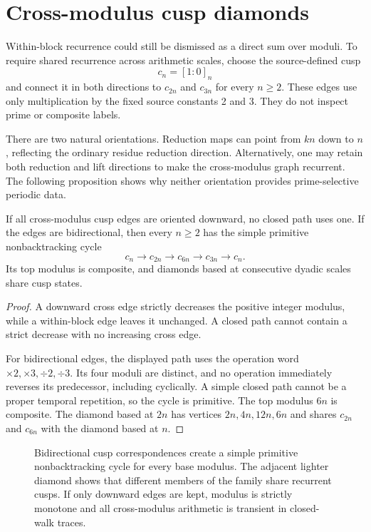 \section{Cross-modulus cusp diamonds}
\label{sec:cusp-diamonds}

Within-block recurrence could still be dismissed as a direct sum over
moduli.  To require shared recurrence across arithmetic scales, choose the
source-defined cusp
\[
 c_n=[1:0]_n
\]
and connect it in both directions to $c_{2n}$ and $c_{3n}$ for every
$n\ge2$.  These edges use only multiplication by the fixed source constants 2
and 3.  They do not inspect prime or composite labels.

There are two natural orientations.  Reduction maps can point from $kn$ down
to $n$, reflecting the ordinary residue reduction direction.  Alternatively,
one may retain both reduction and lift directions to make the cross-modulus
graph recurrent.  The following proposition shows why neither orientation
provides prime-selective periodic data.

\begin{proposition}
\label{prop:orientation-dichotomy}
If all cross-modulus cusp edges are oriented downward, no closed path uses
one.  If the edges are bidirectional, then every $n\ge2$ has the simple
primitive nonbacktracking cycle
\[
 c_n\to c_{2n}\to c_{6n}\to c_{3n}\to c_n.
\]
Its top modulus is composite, and diamonds based at consecutive dyadic scales
share cusp states.
\end{proposition}

\begin{proof}
A downward cross edge strictly decreases the positive integer modulus, while
a within-block edge leaves it unchanged.  A closed path cannot contain a
strict decrease with no increasing cross edge.

For bidirectional edges, the displayed path uses the operation word
$\times2,\times3,\div2,\div3$.  Its four moduli are distinct, and no operation
immediately reverses its predecessor, including cyclically.  A simple closed
path cannot be a proper temporal repetition, so the cycle is primitive.  The
top modulus $6n$ is composite.  The diamond based at $2n$ has vertices
$2n,4n,12n,6n$ and shares $c_{2n}$ and $c_{6n}$ with the diamond based at
$n$.
\end{proof}

\begin{figure}[t]
\centering
\resizebox{0.94\textwidth}{!}{}
\caption{Bidirectional cusp correspondences create a simple primitive
nonbacktracking cycle for every base modulus.  The adjacent lighter diamond
shows that different members of the family share recurrent cusps.  If only
downward edges are kept, modulus is strictly monotone and all cross-modulus
arithmetic is transient in closed-walk traces.}
\label{fig:cusp-diamond}
\end{figure}

